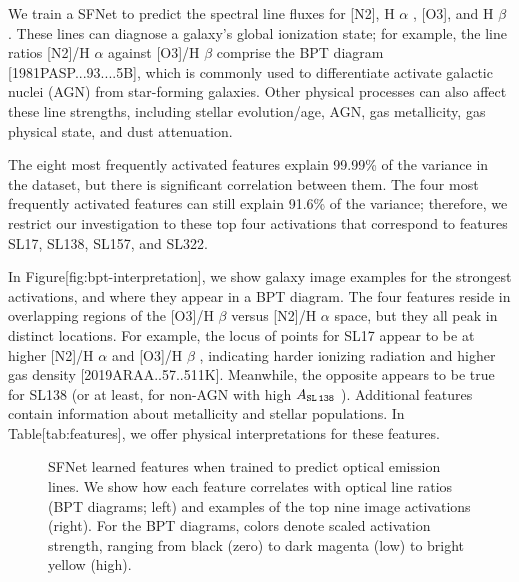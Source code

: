 \documentclass[11pt,a4paper]{article}
\begin{document}
We train a SFNet to predict the spectral line fluxes for [N2], H $\alpha$ , [O3], and H $\beta$ . These lines can diagnose a galaxy's global ionization state; for example, the line ratios [N2]/H $\alpha$  against [O3]/H $\beta$  comprise the BPT diagram [1981PASP...93....5B], which is commonly used to differentiate activate galactic nuclei (AGN) from star-forming galaxies. Other physical processes can also affect these line strengths, including stellar evolution/age, AGN, gas metallicity, gas physical state, and dust attenuation.

The eight most frequently activated features explain 99.99\% of the variance in the dataset, but there is significant correlation between them. The four most frequently activated features can still explain 91.6\% of the variance; therefore, we restrict our investigation to these top four activations that correspond to features SL17, SL138, SL157, and SL322.

In Figure[fig:bpt-interpretation], we show galaxy image examples for the strongest activations, and where they appear in a BPT diagram. The four features reside in overlapping regions of the [O3]/H $\beta$  versus [N2]/H $\alpha$  space, but they all peak in distinct locations. For example, the locus of points for SL17 appear to be at higher [N2]/H $\alpha$  and [O3]/H $\beta$ , indicating harder ionizing radiation and higher gas density [2019ARAA..57..511K]. Meanwhile, the opposite appears to be true for SL138 (or at least, for non-AGN with high  $A_{\tt SL\,138}$ ). Additional features contain information about metallicity and stellar populations. In Table[tab:features], we offer physical interpretations for these features.

\begin{figure}[h]
\caption{SFNet learned features when trained to predict optical emission lines. We show how each feature correlates with optical line ratios (BPT diagrams; left) and examples of the top nine image activations (right). For the BPT diagrams, colors denote scaled activation strength, ranging from black (zero) to dark magenta (low) to bright yellow (high).}
\end{figure}

\begin{figure}[h]
\end{figure}

\begin{figure}[h]
\end{figure}

\begin{figure}[h]
\end{figure}
\end{document}
